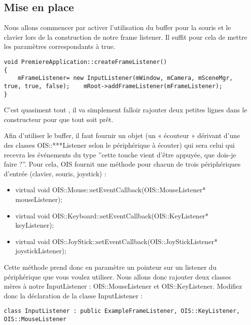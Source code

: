 \documentclass[10pt,a4paper]{report}
\begin{document}
\subsection{Mise en place}


Nous allons commencer par activer l'utilisation du buffer pour la souris et le clavier lors de la construction de notre frame listener. Il suffit pour cela de mettre les param\`etres correspondants \`a true.


\begin{lstlisting}[caption={Activation du buffer pour la souris et le clavier}]
void PremiereApplication::createFrameListener()
{
    mFrameListener= new InputListener(mWindow, mCamera, mSceneMgr, true, true, false);    mRoot->addFrameListener(mFrameListener);
}
\end{lstlisting}


C'est quasiment tout , il va simplement falloir rajouter deux petites lignes dans le constructeur pour que tout soit pr\^et.

Afin d'utiliser le buffer, il faut fournir un objet (un « \'ecouteur » d\'erivant d'une des classes OIS::***Listener selon le p\'eriph\'erique \`a \'ecouter) qui sera celui qui recevra les \'ev\'enements du type ''cette touche vient d'\^etre appuy\'ee, que dois-je faire ?''. Pour cela, OIS fournit une m\'ethode pour chacun de trois p\'eriph\'eriques d'entr\'ee (clavier, souris, joystick) :


\begin{itemize}
\item  virtual void OIS::Mouse::setEventCallback(OIS::MouseListener* mouseListener);
\item  virtual void OIS::Keyboard::setEventCallback(OIS::KeyListener* keyListener);
\item  virtual void OIS::JoyStick::setEventCallback(OIS::JoyStickListener* joystickListener);
\end{itemize}

Cette m\'ethode prend donc en param\`etre un pointeur sur un listener du p\'eriph\'erique que vous voulez utiliser. Nous allons donc rajouter deux classes m\`eres \`a notre InputListener : OIS::MouseListener et OIS::KeyListener. Modifiez donc la d\'eclaration de la classe InputListener :

\begin{lstlisting}[caption={Classes m\`eres pour gestion des Listeners}]
class InputListener : public ExampleFrameListener, OIS::KeyListener, OIS::MouseListener
\end{lstlisting}
\end{document}
